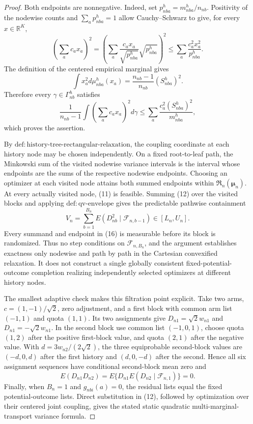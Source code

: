 \documentclass{article}
\begin{document}
\begin{proof}
Both endpoints are nonnegative. Indeed, set \(p_{nba}^h=m_{nba}^h/n_{nb}\). Positivity of the nodewise counts and \(\sum_ap_{nba}^h=1\) allow Cauchy--Schwarz to give, for every \(x\in\mathbb R^K\),
\[
\left(\sum_ac_ax_a\right)^2
=\left(\sum_a\frac{c_ax_a}{\sqrt{p_{nba}^h}}\sqrt{p_{nba}^h}\right)^2
\le\sum_a\frac{c_a^2x_a^2}{p_{nba}^h}.
\tag{13}
\]
The definition of the centered empirical marginal gives
\[
\int x_a^2d\mu_{nba}^h(x_a)
=\frac{n_{nb}-1}{n_{nb}}(S_{nba}^h)^2.
\tag{14}
\]
Therefore every \(\gamma\in\Gamma_{nb}^h\) satisfies
\[
\frac1{n_{nb}-1}\int\left(\sum_ac_ax_a\right)^2d\gamma
\le\sum_a\frac{c_a^2(S_{nba}^h)^2}{m_{nba}^h},
\tag{15}
\]
which proves the assertion.

By \(\mathrm{def:history\text{-}tree\text{-}rectangular\text{-}relaxation}\), the coupling coordinate at each history node may be chosen independently. On a fixed root-to-leaf path, the Minkowski sum of the visited nodewise variance intervals is the interval whose endpoints are the sums of the respective nodewise endpoints. Choosing an optimizer at each visited node attains both summed endpoints within \(\mathfrak R_n(\boldsymbol\mu_n)\). At every actually visited node, (11) is feasible. Summing (12) over the visited blocks and applying \(\mathrm{def:qv\text{-}envelope}\) gives the predictable pathwise containment
\[
V_n=\sum_{b=1}^{B_n}E(D_{nb}^2\mid\mathcal F_{n,b-1})\in[L_n,U_n].
\tag{16}
\]
Every summand and endpoint in (16) is measurable before its block is randomized. Thus no step conditions on \(\mathcal F_{n,B_n}\), and the argument establishes exactness only nodewise and path by path in the Cartesian convexified relaxation. It does not construct a single globally consistent fixed-potential-outcome completion realizing independently selected optimizers at different history nodes.

The smallest adaptive check makes this filtration point explicit. Take two arms, \(c=(1,-1)/\sqrt2\), zero adjustment, and a first block with common arm list \((-1,1)\) and quota \((1,1)\). Its two assignments give \(D_{n1}=\sqrt2w_{n1}\) and \(D_{n1}=-\sqrt2w_{n1}\). In the second block use common list \((-1,0,1)\), choose quota \((1,2)\) after the positive first-block value, and quota \((2,1)\) after the negative value. With \(d=3w_{n2}/(2\sqrt2)\), the three equiprobable second-block values are \((-d,0,d)\) after the first history and \((d,0,-d)\) after the second. Hence all six assignment sequences have conditional second-block mean zero and
\[
E(D_{n1}D_{n2})
=E\{D_{n1}E(D_{n2}\mid\mathcal F_{n,1})\}=0.
\tag{17}
\]
Finally, when \(B_n=1\) and \(g_{nbi}(a)=0\), the residual lists equal the fixed potential-outcome lists. Direct substitution in (12), followed by optimization over their centered joint coupling, gives the stated static quadratic multi-marginal-transport variance formula.
\end{proof}
\end{document}
